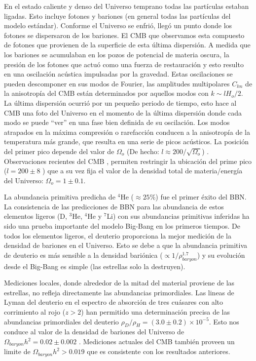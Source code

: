 En el estado caliente y denso del Universo temprano todas las partículas estaban ligadas. Esto incluye fotones y bariones (en general todas las partículas del modelo estándar). Conforme el Universo se enfrió, llegó un punto donde los fotones se dispersaron de los bariones. El CMB que observamos esta compuesto de fotones que provienen de la superficie de esta última dispersión. A medida que los bariones se acumulaban en los pozos de potencial de materia oscura, la presión de los fotones que actuó como una fuerza de restauración y esto resulto en una oscilación acústica impulsadas por la gravedad. Estas oscilaciones se pueden descomponer en sus modos de Fourier, las amplitudes multipolares $C_{lm}$ de la anisotropía del CMB están determinados por aquellos modos con $k\sim lH_o /2$. La última dispersión ocurrió por un pequeño periodo de tiempo, esto hace al CMB una foto del Universo en el momento de la última dispersión donde cada modo se puede ``ver'' en una fase bien definida de su oscilación. Los modos atrapados en la máxima compresión o rarefacción conducen a la anisotropía de la temperatura más grande, que resulta en una serie de picos acústicos. La posición del primer pico depende del valor de $\Omega_o$ (De hecho: $l \approx 200/\sqrt{\Omega_o}$) \cite{1999ASPC..165..431T}. Observaciones recientes del CMB \cite{ 2013ApJS..208...20B, 2020A&A...641A...1P}, permiten restringir la ubicación del prime pico ($l = 200 \pm 8$ \cite{2001ApJ...549..669H}) que a su vez fija el valor de la densidad total de materia/energía del Universo: $\Omega_o = 1 \pm 0.1$.

La abundancia primitiva predicha de $^4$He ($\approx 25\%$) fue el primer éxito del BBN. La consistencia de las predicciones de BBN  para las abundancia de estos elementos ligeros (D, $^3$He, $^4$He y $^7$Li) con sus abundancias primitivas inferidas ha sido una prueba importante del modelo Big-Bang en los primeros tiempos. De todos los elementos ligeros, el deuterio proporciona la mejor medición de la densidad de bariones en el Universo. Esto se debe a que la  abundancia primitiva de deuterio es más sensible a la densidad bariónica ($\propto 1/\rho_{baryon}^{1.7} $) y su evolución desde el Big-Bang es simple (las estrellas solo la destruyen).

Mediciones locales, donde alrededor de la mitad del material proviene de las estrellas, no refleja directamente las abundancias primordiales. Las lineas de Lyman del deuterio en el espectro de absorción de tres cuásares con alto corrimiento al rojo ($z>2$) han permitido una determinación precisa de las abundancias primordiales del deuterio $\rho_D/\rho_H = \left( 3.0 \pm 0.2 \right)\times 10^{-5 }$\cite{2001ApJ...552L...1B}. Esto nos conduce al valor de la densidad de bariones del Universo de $\Omega_{baryon}h^2 = 0.02 \pm 0.002$ \cite{2001ApJ...552L...1B}. Mediciones actuales del CMB también proveen un limite de $\Omega_{baryon}h^2 > 0.019$ \cite{2001ApJ...549..669H} que es consistente con los resultados anteriores.

